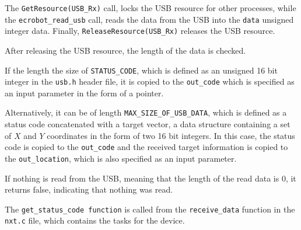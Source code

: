 The \texttt{GetResource(USB\_Rx)} call, locks the USB resource for other processes, while the \texttt{ecrobot\_read\_usb} call, reads the data from the USB into the \texttt{data} unsigned integer data.
Finally, \texttt{ReleaseResource(USB\_Rx)} releases the USB resource.


After releasing the USB resource, the length of the data is checked.

If the length the size of \texttt{STATUS\_CODE}, which is defined as an unsigned 16 bit integer in the \texttt{usb.h} header file, it is copied to the \texttt{out\_code} which is specified as an input parameter in the form of a pointer.


Alternatively, it can be of length \texttt{MAX\_SIZE\_OF\_USB\_DATA}, which is defined as a status code concatenated with a target vector, a data structure containing a set of $X$ and $Y$ coordinates in the form of two 16 bit integers.
In this case, the status code is copied to the \texttt{out\_code} and the received target information is copied to the \texttt{out\_location}, which is also specified as an input parameter.


If nothing is read from the USB, meaning that the length of the read data is $0$, it returns false, indicating that nothing was read.



The \texttt{get\_status\_code function} is called from the \texttt{receive\_data} function in the \texttt{nxt.c} file, which contains the tasks for the device.
